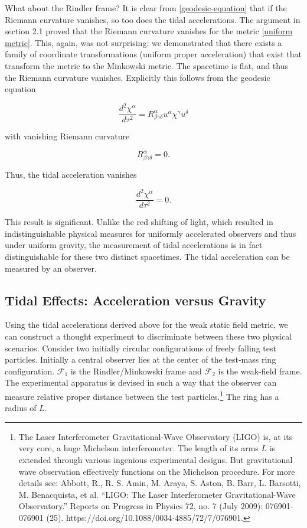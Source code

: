 \documentclass[11pt]{article}
\begin{document}
What about the Rindler frame? It is clear from \eqref{geodesic-equation} that if the Riemann curvature vanishes, so too does the tidal accelerations. The argument in section 2.1 proved that the Riemann curvature vanishes for the metric \eqref{uniform metric}. This, again, was not surprising: we demonstrated that there exists a family of coordinate transformations (uniform proper acceleration) that exist that transform the metric to the Minkowski metric. The spacetime is flat, and thus the Riemann curvature vanishes. Explicitly this follows from the geodesic equation

\begin{equation}
    \frac{d^2\chi^{\alpha}}{d \tau^2} = R^{\alpha}_{\beta \gamma \delta} u^{\alpha} \chi^{\gamma} u^{\delta}
\end{equation}

with vanishing Riemann curvature

\begin{equation}
    R^{\alpha}_{\beta \gamma \delta} = 0.
\end{equation}

Thus, the tidal acceleration vanishes

\begin{equation}
    \frac{d^2\chi^{\alpha}}{d \tau^2} = 0.
\end{equation}

This result is significant. Unlike the red shifting of light, which resulted in indistinguishable physical measures for uniformly accelerated observers and thus under uniform gravity, the measurement of tidal accelerations is in fact distinguishable for these two distinct spacetimes. The tidal acceleration can be measured by an observer.

\subsection{Tidal Effects: Acceleration versus Gravity}

Using the tidal accelerations derived above for the weak static field metric, we can construct a thought experiment to discriminate between these two physical scenarios. Consider two initially circular configurations of freely falling test particles. Initially a central observer lies at the center of the test-mass ring configuration. $\mathcal F_1$ is the Rindler/Minkowski frame and $\mathcal F_2$ is the weak-field frame. The experimental apparatus is devised in such a way that the observer can measure relative proper distance between the test particles.\footnote{The Laser Interferometer Gravitational-Wave Observatory (LIGO) is, at its very core, a huge Michelson interferometer. The length of its arms $L$ is extended through various ingenious experimental designs. But gravitational wave observation effectively functions on the Michelson procedure. For more details see: Abbott, R., R. S. Amin, M. Araya, S. Aston, B. Barr, L. Barsotti, M. Benacquista, et al. “LIGO: The Laser Interferometer Gravitational-Wave Observatory.” Reports on Progress in Physics 72, no. 7 (July 2009): 076901-076901 (25). https://doi.org/10.1088/0034-4885/72/7/076901.} The ring has a radius of $L$.
\end{document}
